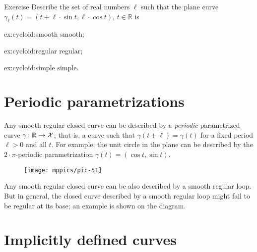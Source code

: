 \begin{thm}{Exercise}\label{ex:cycloid}
Describe the set of real numbers $\ell$
such that the plane curve $\gamma_\ell (t)= (t+\ell \cdot \sin t,\ell \cdot \cos t)$, $t\in\mathbb{R}$ is

\begin{minipage}{.30\textwidth}
\begin{subthm}{ex:cycloid:smooth}
smooth; 
\end{subthm}
\end{minipage}
\hfill
\begin{minipage}{.30\textwidth}
\begin{subthm}{ex:cycloid:regular}
regular;
\end{subthm}
\end{minipage}
\hfill
\begin{minipage}{.30\textwidth}
\begin{subthm}{ex:cycloid:simple}
simple.
\end{subthm}
\end{minipage}

\end{thm}

\section{Periodic parametrizations}

Any smooth regular closed curve can be described by a {}\emph{periodic} parametrized curve $\gamma\colon \mathbb{R}\to \mathcal{X}$;
that is, a curve such that $\gamma(t+\ell)=\gamma(t)$ for a fixed period $\ell>0$ and all $t$.
For example, the unit circle in the plane can be described by the $2{\cdot}\pi$-periodic parametrization $\gamma(t)=(\cos t,\sin t)$.

{

\begin{wrapfigure}{o}{17 mm}
\vskip-2mm
\centering
\texttt{[image: mppics/pic-51]}
\end{wrapfigure}

Any smooth regular closed curve can be also described by a smooth regular loop.
But in general, the closed curve described by a smooth regular loop might fail to be regular at its base; an example is shown on the diagram.

}

\section{Implicitly defined curves}\label{sec:implicit-curves}


